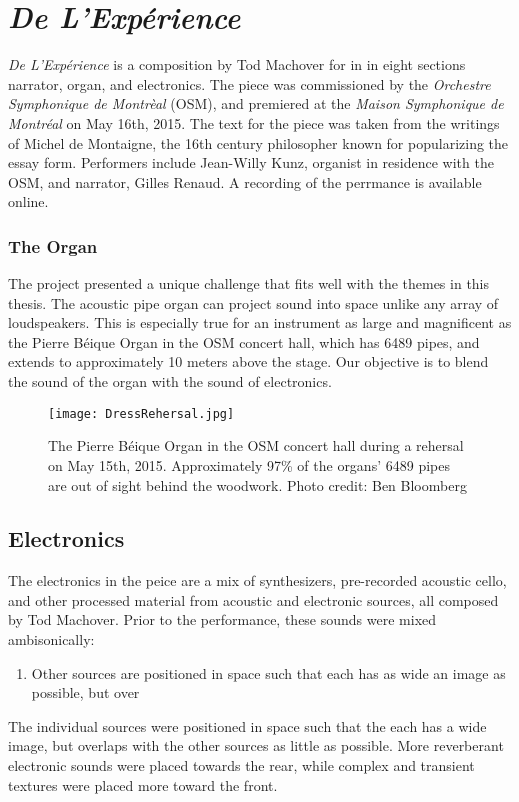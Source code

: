 \clearpage
\chapter{\textit{De L'Exp\'{e}rience}}
\label{ch:experience}

\textit{De L'Exp\'{e}rience} is a composition by Tod Machover for in
in eight sections 
narrator, organ, and electronics. The piece was commissioned by the
\textit{Orchestre Symphonique de Montr\`{e}al} (OSM), and premiered at
the \textit{Maison Symphonique de Montr\'{e}al} on May 16th, 2015. The
text for the piece was taken from the writings of Michel de Montaigne,
the 16th century philosopher known for popularizing the essay form.
Performers include Jean-Willy Kunz, organist in residence with the
OSM, and narrator, Gilles Renaud. A recording of the perrmance is
available
online.


\subsection{The Organ}
\label{sec:organ}
The project presented a unique challenge that fits well with the
themes in this thesis. The acoustic pipe organ can project sound into
space unlike any array of loudspeakers. This is especially true for an
instrument as large and magnificent as the Pierre B\'{e}ique Organ in
the OSM concert hall, which has 6489 pipes, and extends to
approximately 10 meters above the stage. Our objective is to blend
the sound of the organ with the sound of electronics. 

\begin{figure*}[]
  \texttt{[image: DressRehersal.jpg]}
  \caption{The Pierre B\'{e}ique Organ in the OSM concert hall during
    a rehersal on May 15th, 2015. Approximately 97\% of the organs'
    6489 pipes are out of sight behind the woodwork. Photo credit: Ben
    Bloomberg}
  \label{fig:le-corbusier-sketch}
\end{figure*}


\section{Electronics}
\label{sec:electronics}
The electronics in the peice are a mix of synthesizers, pre-recorded
acoustic cello, and other processed material from acoustic and
electronic sources, all composed by Tod Machover. Prior to the
performance, these sounds were mixed ambisonically:
\begin{enumerate}
\item Other sources are positioned in space such that each has as wide
  an image as possible, but over 
\end{enumerate}The individual
sources were positioned in space such that the each has a wide image,
but overlaps with the other sources as little as possible. More
reverberant electronic sounds were placed towards the rear, while
complex and transient textures were placed more toward the front. 

